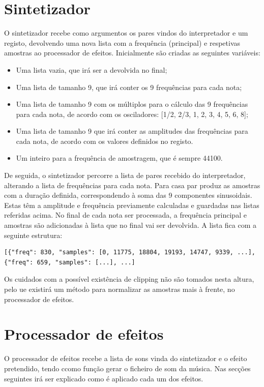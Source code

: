 \section{Sintetizador}
O sintetizador recebe como argumentos os pares vindos do interpretador e um registo, devolvendo uma nova lista com a frequência (principal) e respetivas amostras ao processador de efeitos. Inicialmente são criadas as seguintes variáveis:

\begin{itemize}
\item Uma lista vazia, que irá ser a devolvida no final;
\item Uma lista de tamanho 9, que irá conter os 9 frequências para cada nota;
\item Uma lista de tamanho 9 com os múltiplos para o cálculo das 9 frequências para cada nota, de acordo com os osciladores: [1/2, 2/3, 1, 2, 3, 4, 5, 6, 8];
\item Uma lista de tamanho 9 que irá conter as amplitudes das frequências para cada nota, de acordo com os valores definidos no registo.
\item Um inteiro para a frequência de amostragem, que é sempre 44100.
\end{itemize}

De seguida, o sintetizador percorre a lista de pares recebido do interpretador, alterando a lista de frequências para cada nota. Para casa par produz as amostras com a duração definida, correspondendo à soma das 9 componentes sinusoidais. Estas têm a amplitude e frequência previamente calculadas e guardadas nas listas referidas acima. No final de cada nota ser processada, a frequência principal e amostras são adicionadas à lista que no final vai ser devolvida. A lista fica com a seguinte estrutura:

\vspace{5mm}
\begin{lstlisting}
[{"freq": 830, "samples": [0, 11775, 18804, 19193, 14747, 9339, ...], {"freq": 659, "samples": [...], ...]
\end{lstlisting}
\vspace{5mm}

Os cuidados com a possível existência de clipping não são tomados nesta altura, pelo ue existirá um método para normalizar as amostras mais à frente, no processador de efeitos.

\section{Processador de efeitos}
O processador de efeitos recebe a lista de sons vinda do sintetizador e o efeito pretendido, tendo ccomo função gerar o ficheiro de som da música. Nas secções seguintes irá ser explicado como é aplicado cada um dos efeitos.

